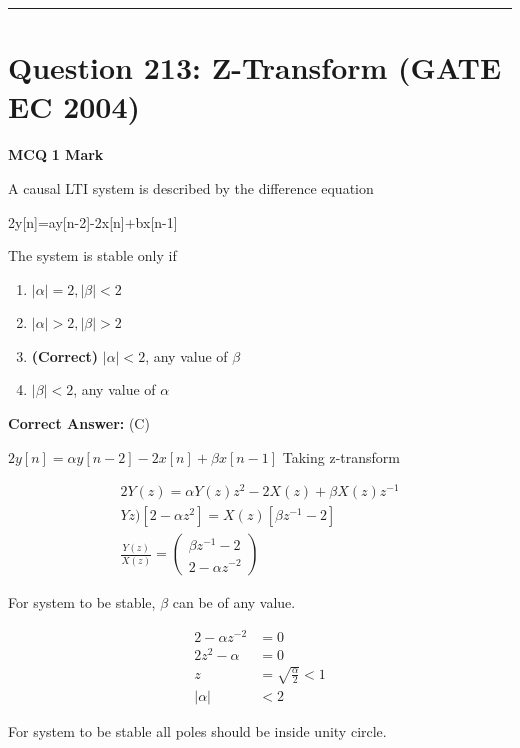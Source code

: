 \documentclass[11pt,a4paper]{article}
\begin{document}
\vspace{1.5em}
\hrule
\vspace{1.5em}

\section*{Question 213: Z-Transform (GATE EC 2004)}
\noindent \textbf{\color{primary}MCQ} \hfill \textbf{\color{secondary}1 Mark}


\noindent A causal LTI system is described by the difference equation

2y[n]=ay[n-2]-2x[n]+bx[n-1] 

The system is stable only if


\begin{enumerate}[label=(\Alph*)]
    \item $|\alpha |=2,|\beta |< 2$
    \item $|\alpha | > 2,|\beta | > 2$
    \item \textbf{(Correct)} $|\alpha | <2$, any value of $\beta$
    \item $|\beta |< 2$,  any value of $\alpha$
\end{enumerate}

\noindent \textbf{Correct Answer:} (C)

\begin{tcolorbox}[solbox, title=Detailed Solution -- Question 213]
$2 y[n]=\alpha y[n-2]-2 x[n]+\beta x[n-1]$
 Taking z-transform

\[
\begin{array}{c} 2 Y(z)=\alpha Y(z) z^{2}-2 X(z)+\beta X(z) z^{-1} \\ Y z)\left[2-\alpha z^{2}\right]=X(z)\left[\beta z^{-1}-2\right] \\ \frac{Y(z)}{X(z)}=\left(\begin{array}{c} \beta z^{-1}-2 \\ 2-\alpha z^{-2} \end{array}\right) \end{array}
\]

 For system to be stable, $\beta$ can be of any value.

\[
\begin{aligned} 2-\alpha z^{-2} &=0 \\ 2 z^{2}-\alpha &=0 \\ z &=\sqrt{\frac{\alpha}{2}} < 1 \\ |\alpha| & < 2 \end{aligned}
\]

 For system to be stable all poles should be inside unity circle.
\end{tcolorbox}
\end{document}
